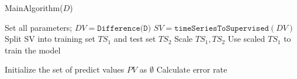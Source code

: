 \documentclass[twocolumn]{article}
\begin{document}
\begin{appendices}
\begin{algorithm}[htbp]
\SetAlgoLined
{}
\caption{MainAlgorithm($D$)}
\label{alg:a5}
\BlankLine
{}
Set all parameters;
$DV  = \texttt{Difference(D)}$\;
$SV = \texttt{timeSeriesToSupervised}(DV)$\;
Split SV into training set $TS_1$ and test set $TS_2$\;
Scale $TS_1,TS_2$\;
Use scaled $TS_1$ to train the model\;

Initialize the set of predict values $PV$ as $\emptyset$\;
Calculate error rate\;
\end{algorithm}
\end{appendices}
\end{document}
